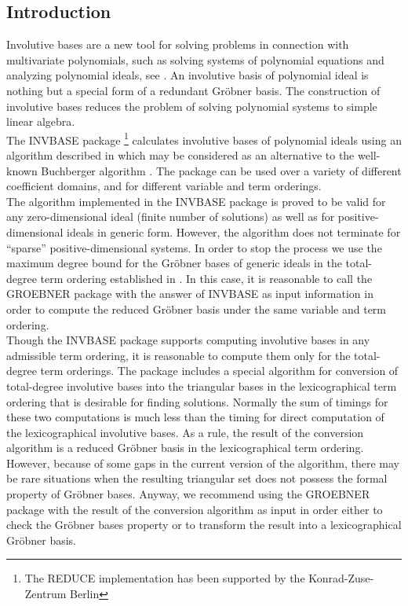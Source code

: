 
\subsection{Introduction}
Involutive bases are a new tool for solving problems in connection with
multivariate polynomials, such as solving systems of polynomial equations
and analyzing polynomial ideals, see \cite{Lille}. An involutive basis of
polynomial ideal is nothing but a special form of a redundant Gr\"obner
basis. The construction of involutive bases reduces the problem of solving
polynomial systems to simple linear algebra.\\
The INVBASE package
\footnote{The REDUCE implementation has been supported by
the Konrad-Zuse-Zentrum Berlin}
calculates involutive bases of polynomial ideals
using an algorithm described in \cite{Lille}
which may be considered as an alternative to
the well-known Buchberger algorithm \cite{Buch}.
The package can be used over
a variety of different coefficient domains, and for different variable
and term orderings.\\
The algorithm implemented in the INVBASE package is proved
to be valid for any zero-dimensional ideal (finite number of solutions)
as well as for positive-dimensional ideals in generic form. However,
the algorithm does not terminate for ``sparse'' positive-dimensional systems.
In order to stop the process we use the maximum degree
bound for the Gr\"obner bases of generic ideals in the total-degree
term ordering established in \cite{Laz}.
In this case, it is reasonable
to call the GROEBNER package with the answer of INVBASE as input
information in order to compute the reduced Gr\"obner basis under the
same variable and term ordering.\\
Though the INVBASE package supports computing involutive bases in any
admissible term ordering,
it is reasonable to compute them only for the total-degree term
orderings. The package includes a special algorithm for conversion
of total-degree involutive bases into the triangular bases
in the lexicographical term ordering that is desirable for
finding solutions. Normally the sum of timings for these two
computations is much less than the timing for direct computation
of the lexicographical involutive bases. As a rule, the result
of the conversion algorithm is a reduced Gr\"obner basis in the
lexicographical term ordering. However, because of some gaps in
the current version of the algorithm,
there may be rare situations when the resulting triangular set
does not possess the formal property of Gr\"obner bases.
Anyway, we recommend using the GROEBNER package with the result
of the conversion algorithm as input in order either to check
the Gr\"obner bases property or to transform the result into a
lexicographical Gr\"obner basis.
